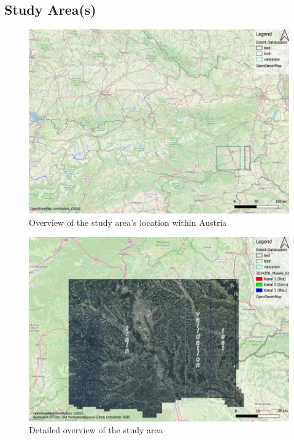 \documentclass{report}
\begin{document}
\subsection{Study Area(s)}
\par
\begin{figure}[H]
    \centering
    \includegraphics[width=1\linewidth]{Images_from_other_sources/uebersicht_at_low_dpi.jpg}
        \caption{Overview of the study area's location within Austria}
    \label{fig:overview_map}
\end{figure}

\begin{figure}
    \centering
    \includegraphics[width=1\linewidth]{Images_from_other_sources/detail_dataloader_orthophoto_low_res.jpg}
        \caption{Detailed overview of the study area}
    \label{fig:detail_overview_map}
\end{figure}
\end{document}
